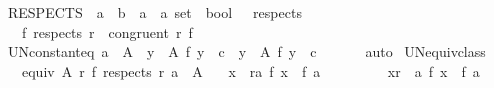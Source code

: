 \begin{isabellebody}
\ RESPECTS\ {\isacharcolon}{\kern0pt}{\isacharcolon}{\kern0pt}\ {\isachardoublequoteopen}{\isacharparenleft}{\kern0pt}{\isacharprime}{\kern0pt}a\ {\isasymRightarrow}\ {\isacharprime}{\kern0pt}b{\isacharparenright}{\kern0pt}\ {\isasymRightarrow}\ {\isacharparenleft}{\kern0pt}{\isacharprime}{\kern0pt}a\ {\isasymtimes}\ {\isacharprime}{\kern0pt}a{\isacharparenright}{\kern0pt}\ set\ {\isasymRightarrow}\ bool{\isachardoublequoteclose}\ \ {\isacharparenleft}{\kern0pt}\ {\isachardoublequoteopen}respects{\isachardoublequoteclose}\ {}{}{\isacharparenright}{\kern0pt}\isanewline
\ \ \ {\isachardoublequoteopen}f\ respects\ r\ {\isasymequiv}\ congruent\ r\ f{\isachardoublequoteclose}\isanewline
\isanewline
\isanewline
{}\isamarkupfalse%
\ UN{\isacharunderscore}{\kern0pt}constant{\isacharunderscore}{\kern0pt}eq{\isacharcolon}{\kern0pt}\ {\isachardoublequoteopen}a\ {\isasymin}\ A\ {\isasymLongrightarrow}\ {\isasymforall}y\ {\isasymin}\ A{\isachardot}{\kern0pt}\ f\ y\ {\isacharequal}{\kern0pt}\ c\ {\isasymLongrightarrow}\ {\isacharparenleft}{\kern0pt}{\isasymUnion}y\ {\isasymin}\ A{\isachardot}{\kern0pt}\ f\ y{\isacharparenright}{\kern0pt}\ {\isacharequal}{\kern0pt}\ c{\isachardoublequoteclose}\isanewline
\ \ %
\isanewline
%
\isadelimproof
\ \ %
\endisadelimproof
%
\isatagproof
{}\isamarkupfalse%
\ auto%
\endisatagproof
{\isafoldproof}%
%
\isadelimproof
\isanewline
%
\endisadelimproof
\isanewline
{}\isamarkupfalse%
\ UN{\isacharunderscore}{\kern0pt}equiv{\isacharunderscore}{\kern0pt}class{\isacharcolon}{\kern0pt}\isanewline
\ \ \ {\isachardoublequoteopen}equiv\ A\ r{\isachardoublequoteclose}\ {\isachardoublequoteopen}f\ respects\ r{\isachardoublequoteclose}\ {\isachardoublequoteopen}a\ {\isasymin}\ A{\isachardoublequoteclose}\isanewline
\ \ \ {\isachardoublequoteopen}{\isacharparenleft}{\kern0pt}{\isasymUnion}x\ {\isasymin}\ r{\isacharbackquote}{\kern0pt}{\isacharbackquote}{\kern0pt}{\isacharbraceleft}{\kern0pt}a{\isacharbraceright}{\kern0pt}{\isachardot}{\kern0pt}\ f\ x{\isacharparenright}{\kern0pt}\ {\isacharequal}{\kern0pt}\ f\ a{\isachardoublequoteclose}\isanewline
\ \ %
\isanewline
%
\isadelimproof
%
\endisadelimproof
%
\isatagproof
{}\isamarkupfalse%
\ {\isacharminus}{\kern0pt}\isanewline
\ \ \isamarkupfalse%
\ {\isasymsection}{\isacharcolon}{\kern0pt}\ {\isachardoublequoteopen}{\isasymforall}x{\isasymin}r\ {\isacharbackquote}{\kern0pt}{\isacharbackquote}{\kern0pt}\ {\isacharbraceleft}{\kern0pt}a{\isacharbraceright}{\kern0pt}{\isachardot}{\kern0pt}\ f\ x\ {\isacharequal}{\kern0pt}\ f\ a{\isachardoublequoteclose}\isanewline

\end{isabellebody}
